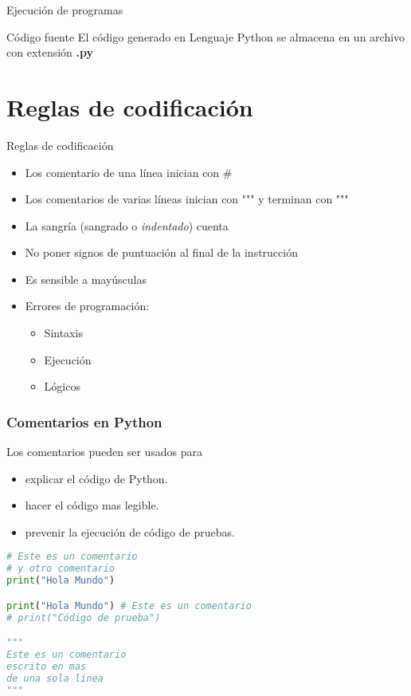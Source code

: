 \begin{frame}[c]{Ejecución de programas}
  \begin{block}{Código fuente}
    El código generado en Lenguaje Python se almacena en un archivo con
    extensión \textbf{.py}
  \end{block}
\end{frame}

\section{Reglas de codificación}

\begin{frame}[c]{Reglas de codificación}
  \begin{itemize}
    \item Los comentario de una línea inician con \textcolor{codeComment}{\#}
    \pausa
    \item Los comentarios de varias líneas inician con
    \textcolor{codeComment}{"""} y terminan con \textcolor{codeComment}{"""}
    \pausa
    \item La sangría (sangrado o \textit{indentado}) cuenta
    \pausa
    \item No poner signos de puntuación al final de la instrucción
    \pausa
    \item Es sensible a mayúsculas
    \pausa
    \item Errores de programación:
          \begin{itemize}
            \item Sintaxis
            \item Ejecución
            \item Lógicos
          \end{itemize}
  \end{itemize}
\end{frame}

\begin{frame}[fragile]
  \frametitle{Comentarios en Python}
  \vspace{\baselineskip}
  Los comentarios pueden ser usados para

  \begin{itemize}
    \item explicar el código de Python.
    \item hacer el código mas legible.
    \item prevenir la ejecución de código de pruebas.
  \end{itemize}

  \pausa
  \begin{lstlisting}[language=Python]
# Este es un comentario
# y otro comentario
print("Hola Mundo")

print("Hola Mundo") # Este es un comentario
# print("Código de prueba")

"""
Este es un comentario
escrito en mas
de una sola linea
"""
  \end{lstlisting}
\end{frame}

